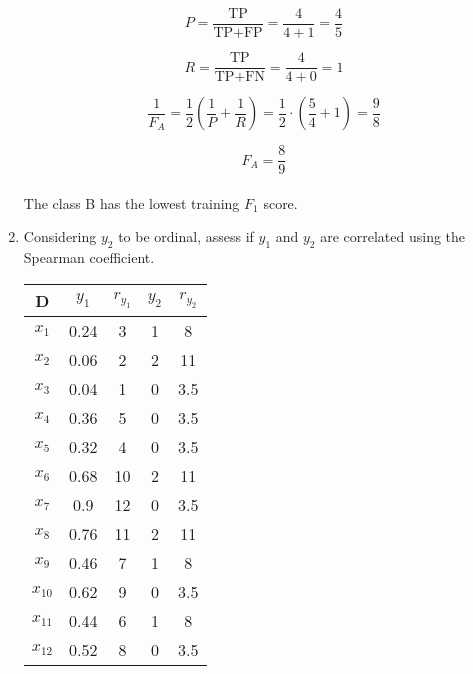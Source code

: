 \documentclass[12pt]{article}
\begin{document}
\begin{enumerate}[leftmargin=\labelsep]
\begin{equation}
    P = \frac{\textrm{TP}}{\textrm{TP} + \textrm{FP}} = \frac{4}{4+1} = \frac{4}{5}
\end{equation}

\begin{equation}
    R = \frac{\textrm{TP}}{\textrm{TP} + \textrm{FN}} = \frac{4}{4+0} = 1
\end{equation}

\begin{equation}
    \frac{1}{F_A} = \frac{1}{2}(\frac{1}{P} + \frac{1}{R}) = \frac{1}{2}\cdot(\frac{5}{4}+1) = \frac{9}{8}
\end{equation}

\begin{equation}
    F_A = \frac{8}{9}
\end{equation}

\paragraph{} The class B has the lowest training $F_1$ score.

\item Considering $y_2$ to be ordinal, assess if $y_1$ and $y_2$ are correlated using the Spearman coefficient.
\begin{center}
    
    \begin{tabular}{|c | c | c | c | c|}
        \hline
        D & $y_1$ & $r_{y_1}$ & $y_2$ & $r_{y_2}$\\
        \hline
        $x_1$    & 0.24 & 3  & 1 & 8 \\
        $x_2$    & 0.06 & 2  & 2 & 11 \\
        $x_3$    & 0.04 & 1  & 0 & 3.5 \\
        $x_4$    & 0.36 & 5  & 0 & 3.5 \\
        $x_5$    & 0.32 & 4  & 0 & 3.5 \\
        $x_6$    & 0.68 & 10 & 2 & 11 \\
        $x_7$    & 0.9  & 12 & 0 & 3.5 \\
        $x_8$    & 0.76 & 11 & 2 & 11 \\
        $x_9$    & 0.46 & 7  & 1 & 8 \\
        $x_{10}$ & 0.62 & 9  & 0 & 3.5 \\
        $x_{11}$ & 0.44 & 6  & 1 & 8 \\
        $x_{12}$ & 0.52 & 8  & 0 & 3.5 \\
        \hline
    \end{tabular}
\end{center}


\end{enumerate}
\end{document}
